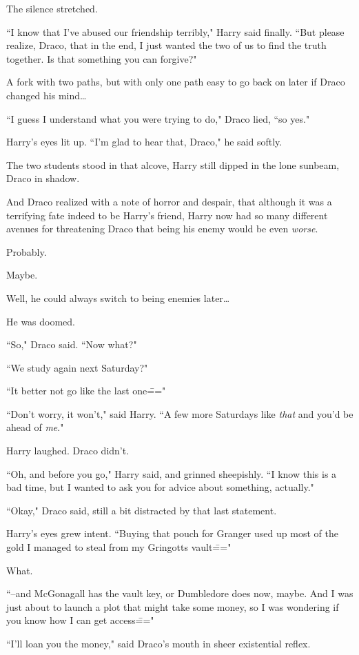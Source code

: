 The silence stretched.

``I know that I've abused our friendship terribly," Harry said finally. ``But please realize, Draco, that in the end, I just wanted the two of us to find the truth together. Is that something you can forgive?"

A fork with two paths, but with only one path easy to go back on later if Draco changed his mind{\ldots}

``I guess I understand what you were trying to do," Draco lied, ``so yes."

Harry's eyes lit up. ``I'm glad to hear that, Draco," he said softly.

The two students stood in that alcove, Harry still dipped in the lone sunbeam, Draco in shadow.

And Draco realized with a note of horror and despair, that although it was a terrifying fate indeed to be Harry's friend, Harry now had so many different avenues for threatening Draco that being his enemy would be even \emph{worse}.

Probably.

Maybe.

Well, he could always switch to being enemies later{\ldots}

He was doomed.

``So," Draco said. ``Now what?"

``We study again next Saturday?"

``It better not go like the last one\==="

``Don't worry, it won't," said Harry. ``A few more Saturdays like \emph{that} and you'd be ahead of \emph{me}."

Harry laughed. Draco didn't.

``Oh, and before you go," Harry said, and grinned sheepishly. ``I know this is a bad time, but I wanted to ask you for advice about something, actually."

``Okay," Draco said, still a bit distracted by that last statement.

Harry's eyes grew intent. ``Buying that pouch for Granger used up most of the gold I managed to steal from my Gringotts vault\==="

What.

``\---and McGonagall has the vault key, or Dumbledore does now, maybe. And I was just about to launch a plot that might take some money, so I was wondering if you know how I can get access\==="

``I'll loan you the money," said Draco's mouth in sheer existential reflex.

